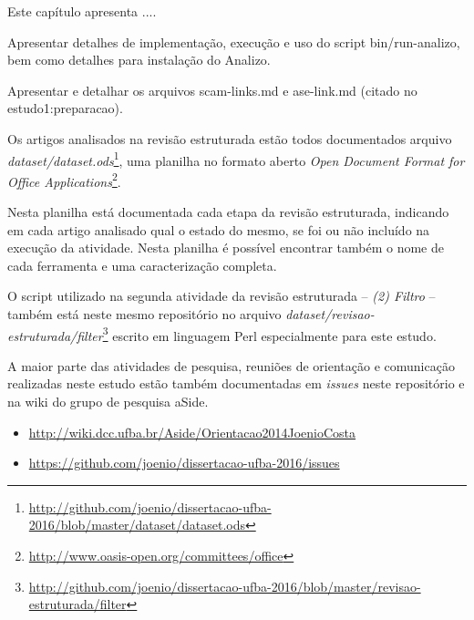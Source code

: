 {Este capítulo apresenta ....}
\label{reproducibilidade-do-estudo}



Apresentar detalhes de implementação, execução e uso do script bin/run-analizo, bem como detalhes para instalação do Analizo.

Apresentar e detalhar os arquivos scam-links.md e ase-link.md (citado no estudo1:preparacao).

Os artigos analisados na revisão estruturada estão todos documentados arquivo
{\it
dataset/dataset.ods}\footnote{\url{http://github.com/joenio/dissertacao-ufba-2016/blob/master/dataset/dataset.ods}},
uma planilha no formato aberto {\it Open Document Format for Office
Applications}\footnote{\url{http://www.oasis-open.org/committees/office}}.

Nesta planilha está documentada cada etapa da revisão estruturada, indicando em
cada artigo analisado qual o estado do mesmo, se foi ou não incluído na
execução da atividade.  Nesta planilha é possível encontrar também o nome de
cada ferramenta e uma caracterização completa.

O script utilizado na segunda atividade da revisão estruturada -- {\it (2)
Filtro} -- também está neste mesmo repositório no arquivo {\it
dataset/revisao-estruturada/filter}\footnote{\url{http://github.com/joenio/dissertacao-ufba-2016/blob/master/revisao-estruturada/filter}}
escrito em linguagem Perl especialmente para este estudo.

A maior parte das atividades de pesquisa, reuniões de orientação e comunicação
realizadas neste estudo estão também documentadas em {\it issues} neste
repositório e na wiki do grupo de pesquisa aSide.

\begin{itemize}
  \item \url{http://wiki.dcc.ufba.br/Aside/Orientacao2014JoenioCosta}
  \item \url{https://github.com/joenio/dissertacao-ufba-2016/issues}
\end{itemize}
